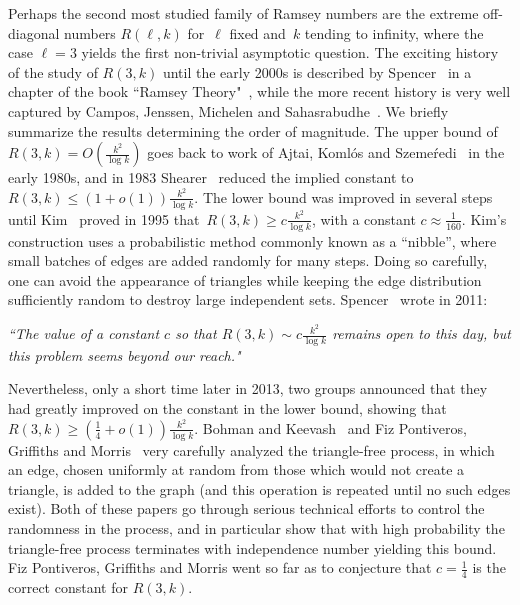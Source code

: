 \documentclass{article}
\begin{document}
Perhaps the second most studied family of  Ramsey numbers are the extreme off-diagonal numbers $R(\ell,k)$ for~$\ell$ fixed and~$k$ tending to infinity, where the case $\ell=3$ yields the first non-trivial asymptotic question. 
The exciting history of the study of $R(3,k)$ until the early 2000s is described by Spencer~\cite{Spencer2011} in a chapter of the book ``Ramsey Theory"~\cite{SoiferRamsey}, while the more recent history is very well captured by 
Campos, Jenssen, Michelen and Sahasrabudhe~\cite{campos2025}. We briefly summarize the results determining the order of magnitude.
The upper bound of $R(3,k) = O(\frac{k^2}{\log{k}})$ goes back to work of Ajtai, Koml\'os and Szeme\'redi~ \cite{AjtaiKSz80,AjtaiKSz81} in the early 1980s, and in 1983 Shearer~\cite{Shearer83} reduced the implied constant to~$R(3,k) \leq (1+o(1))\frac{k^2}{\log{k}}$.
The lower bound was improved in several steps until Kim~\cite{Kim95} proved in 1995 that~$R(3,k)\ge c\frac{k^2}{\log{k}}$, with a constant $c\approx\frac1{160}$. Kim's construction uses a probabilistic method commonly known as a ``nibble'', where small batches of edges are added randomly for many steps.
Doing so carefully, one can avoid the appearance of triangles while keeping the edge distribution sufficiently random to destroy large independent sets.   
Spencer~\cite{Spencer2011} wrote in 2011:

\vspace{0.2cm}
{\em 
``The value
of a constant $c$ so that $R(3,k)\sim
c\frac{k^2}{\log{k}}$ remains open to this day, but this problem
seems beyond our reach."
}

\vspace{0.2cm}
Nevertheless, only a short time later in 2013, two groups announced that they had greatly improved on the constant in the lower bound, showing that~$R(3,k)\ge \left( \frac14 +o(1)\right)\frac{k^2}{\log{k}}$. Bohman and
Keevash~\cite{BohmanKeevash21} and Fiz Pontiveros, Griffiths and Morris~\cite{Fiz20} very carefully analyzed the triangle-free process, in which an edge, chosen uniformly at random from those which would not create a triangle, is added to the graph (and this operation is repeated until no such edges exist). 
Both of these papers go through serious technical efforts to control the randomness in the process, and in particular show
that with high probability the triangle-free process terminates with independence number yielding this bound. 
Fiz Pontiveros, Griffiths and Morris went so far as to conjecture that $c=\frac14$ is the correct constant for $R(3,k)$.
\end{document}
